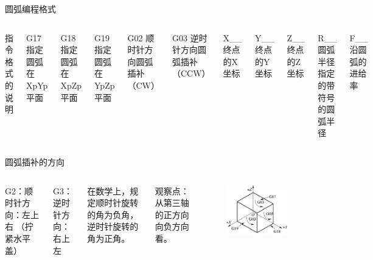 \documentclass[UTF8,zihao=-4,handout,smaller,aspectratio=1610]{ctexbeamer}
\begin{document}
\begin{frame}{圆弧编程格式}
    \begin{columns}
        
      指令格式的说明
      
      G17	指定圆弧在XpYp平面
      
      G18	指定圆弧在XpZp平面
      
      G19	指定圆弧在YpZp平面
      
      G02	顺时针方向圆弧插补（CW）
      
      G03	逆时针方向圆弧插补（CCW）
      
      X\_\_	终点的X坐标
      
      Y\_\_	终点的Y坐标
      
      Z\_\_	终点的Z坐标
      
      R\_\_	圆弧半径指定的带符号的圆弧半径
      
      F\_\_	沿圆弧的进给率           
        
    \end{columns}
\end{frame}



\begin{frame}{圆弧插补的方向}
    \begin{columns}

G2：顺时针方向：左上右 （拧紧水平盖）

G3：逆时针方向：右上左

在数学上，规定顺时针旋转的角为负角，逆时针旋转的角为正角。


观察点：从第三轴的正方向向负方向看。


        
        \begin{figure}
            \centering
            \includegraphics[width=\linewidth]{image/4-2}
            \caption{}
            \label{fig:4-2}
        \end{figure}
        
\end{columns}
\end{frame}
\end{document}
